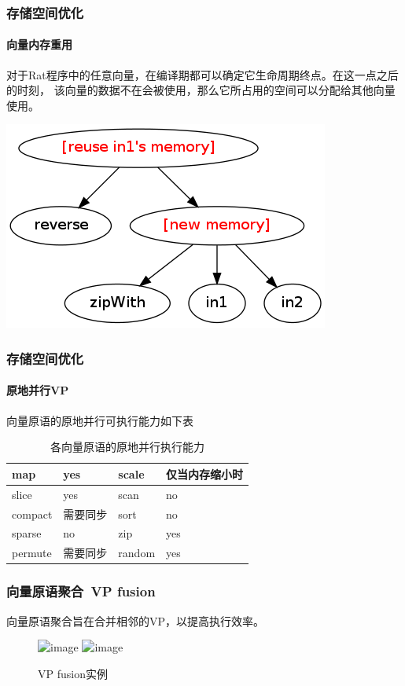 \documentclass{beamer}
\begin{document}
\begin{frame}
  \frametitle{存储空间优化}
  \framesubtitle{向量内存重用}
  对于Rat程序中的任意向量，在编译期都可以确定它生命周期终点。在这一点之后的时刻，
  该向量的数据不在会被使用，那么它所占用的空间可以分配给其他向量使用。
  \pause
  
  \includegraphics[scale=0.3]{images/reversezip.png}
\end{frame}

\begin{frame}
  \frametitle{存储空间优化}
  \framesubtitle{原地并行VP}
  向量原语的原地并行可执行能力如下表
  \begin{table}
    \caption{各向量原语的原地并行执行能力}
    \begin{tabular}{|l|l||l|l|}
      \hline
      map & yes & scale & 仅当内存缩小时\\
      \hline
      slice & yes & scan & no\\
      \hline
      compact & 需要同步 & sort & no\\
      \hline
      sparse & no & zip & yes\\
      \hline
      permute & 需要同步 & random & yes\\
      \hline
    \end{tabular}
  \end{table}
\end{frame}

\begin{frame}[t]
  \frametitle{向量原语聚合~VP fusion}
  向量原语聚合旨在合并相邻的VP，以提高执行效率。
  
  \begin{figure}
    \caption{VP fusion实例}
    \includegraphics<1>[scale=0.35]{images/vp-fusion-1.png}
    \includegraphics<2>[scale=0.35]{images/vp-fusion-2.png}
  \end{figure}
\end{frame}
\end{document}
